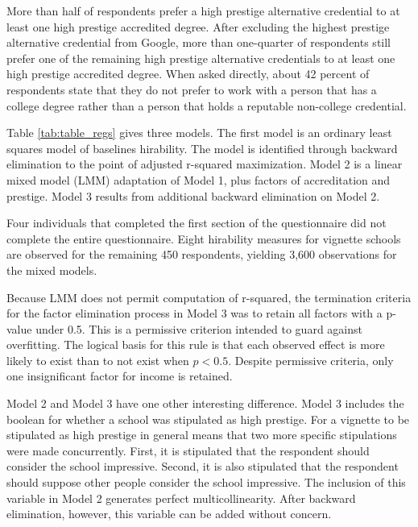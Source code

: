 \documentclass[review]{elsarticle}
\begin{document}
More than half of respondents prefer a high prestige alternative credential to at least one high prestige accredited degree.
After excluding the highest prestige alternative credential from Google,
more than one-quarter of respondents still prefer one of the remaining high prestige alternative credentials to at least one high prestige accredited degree.
When asked directly, about 42 percent of respondents state that they do not prefer
to work with a person that has a college degree rather than a person that holds a reputable non-college credential.



Table \ref{tab:table_regs} gives three models.
The first model is an ordinary least squares model of baselines hirability.
The model is identified through backward elimination to the point of adjusted r-squared maximization.
Model 2 is a linear mixed model (LMM) adaptation of Model 1,
plus factors of accreditation and prestige.
Model 3 results from additional backward elimination on Model 2.

Four individuals that completed the first section of the questionnaire
did not complete the entire questionnaire.
Eight hirability measures for vignette schools are observed for the
remaining 450 respondents, yielding 3,600 observations for the mixed models.

Because LMM does not permit computation of r-squared,
the termination criteria for the factor elimination process in Model 3
was to retain all factors with a p-value under 0.5.
This is a permissive criterion intended to guard against overfitting.
The logical basis for this rule is that each observed effect is
more likely to exist than to not exist when $p < 0.5$.
Despite permissive criteria, only one insignificant factor for income is retained.


Model 2 and Model 3 have one other interesting difference.
Model 3 includes the boolean for whether a school was stipulated as high prestige.
For a vignette to be stipulated as high prestige in general
means that two more specific stipulations were made concurrently.
First, it is stipulated that the respondent should consider the school impressive.
Second, it is also stipulated that the respondent should suppose other people consider the school impressive.
The inclusion of this variable in Model 2 generates perfect multicollinearity.
After backward elimination, however, this variable can be added without concern.
\end{document}

